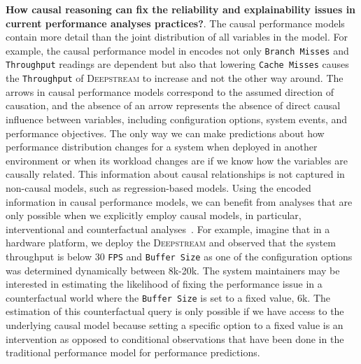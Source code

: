 \textbf{How causal reasoning can fix the reliability and explainability issues in current performance analyses practices?}.
The causal performance models contain more detail than the joint distribution of all variables in the model. For example, the causal performance model in  encodes not only \texttt{Branch Misses} and \texttt{Throughput} readings are dependent but also that lowering \texttt{Cache Misses} causes the \texttt{Throughput} of \textsc{Deepstream} to increase and not the other way around. The arrows in causal performance models correspond to the assumed direction of causation, and the absence of an arrow represents the absence of direct causal influence between variables, including configuration options, system events, and performance objectives. The only way we can make predictions about how performance distribution changes for a system when deployed in another environment or when its workload changes are if we know how the variables are causally related. This information about causal relationships is not captured in non-causal models, such as regression-based models. %
Using the encoded information in causal performance models, we can benefit from analyses that are only possible when we explicitly employ causal models, in particular, interventional and counterfactual analyses~\cite{pearl2009causality, pearl2018book}. For example, imagine that in a hardware platform, we deploy the \textsc{Deepstream} and observed that the system throughput is below 30 \texttt{FPS} and \texttt{Buffer Size} as one of the configuration options was determined dynamically between 8k-20k. The system maintainers may be interested in estimating the likelihood of fixing the performance issue in a counterfactual world where the \texttt{Buffer Size} is set to a fixed value, 6k. The estimation of this counterfactual query is only possible if we have access to the underlying causal model because setting a specific option to a fixed value is an intervention as opposed to conditional observations that have been done in the traditional performance model for performance predictions.  


